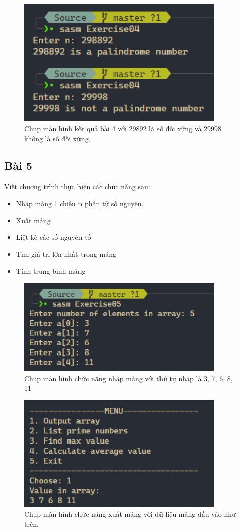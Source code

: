 \begin{figure}[H]
	\centering
	\includegraphics[width=10cm]{images/img4.PNG}
	\caption{Chụp màn hình kết quả bài 4 với 29892 là số đối xứng và 29998 không là số đối xứng.}
\end{figure}

\subsection{Bài 5}

Viết chương trình thực hiện các chức năng sau:
\begin{itemize}
	\item Nhập mảng 1 chiều n phần tử số nguyên.
	\item Xuất mảng
	\item Liệt kê các số nguyên tố
	\item Tìm giá trị lớn nhất trong mảng
	\item Tính trung bình mảng
\end{itemize}

\begin{figure}[H]
	\centering
	\includegraphics[width=10cm]{images/img5_0.PNG}
	\caption{Chụp màn hình chức năng nhập mảng với thứ tự nhập là 3, 7, 6, 8, 11}
\end{figure}

\begin{figure}[H]
	\centering
	\includegraphics[width=10cm]{images/img5_1.PNG}
	\caption{Chụp màn hình chức năng xuất mảng với dữ liệu mảng đầu vào như trên.}
\end{figure}


